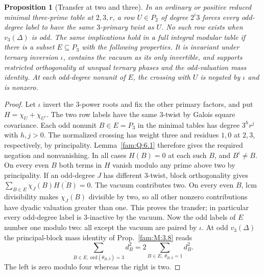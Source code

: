 \documentclass[11pt,a4paper]{article}
\numberwithin{equation}{section}
\newtheorem{proposition}[theorem]{Proposition}
\theoremstyle{remark}
\begin{document}
\begin{proposition}[Transfer at two and three]\label{fam:Q:6.2}
In an ordinary or positive reduced minimal three-prime table at $2,3,r$, a row
$U\in P_2$ of degree $2^i3$ forces every odd-degree label
to have the same $3$-primary twist as $U$. No such row exists
when $v_3(\Delta)$ is odd. The same implications hold in a full
integral modular table if there is a subset $E\subseteq P_3$
with the following properties. It is invariant under ternary
inversion $\iota$, contains the vacuum as its only invertible,
and supports restricted orthogonality at unequal ternary phases
and the odd-valuation mass identity. At each odd-degree nonunit
of $E$, the crossing with $U$ is negated by $\iota$ and is nonzero.
\end{proposition}
\begin{proof}
Let $\iota$ invert the $3$-power roots and fix the other primary
factors, and put $H=\chi_U+\chi_{U^\iota}$. The two row labels
have the same $3$-twist by Galois square covariance. Each odd
nonunit $B\in E=P_3$ in the minimal tables has degree $3^h r^j$
with $h,j>0$. The normalized crossing has weight three and residues
$1,0$ at $2,3$, respectively, by principality. Lemma~\ref{fam:Q:6.1}
therefore gives the required negation and nonvanishing. In all cases
$H(B)=0$ at each such $B$, and $B^\iota\ne B$. On every even $B$ both terms in $H$ vanish
modulo any prime above two by principality. If an odd-degree $J$
has different $3$-twist, block orthogonality gives
$\sum_{B\in E}\chi_J(B)\overline{H(B)}=0$. The vacuum
contributes two. On every even $B$, lcm divisibility makes
$\chi_J(B)$ divisible by two, so all other nonzero contributions
have dyadic valuation greater than one. This proves the transfer;
in particular every odd-degree label is $3$-inactive by the vacuum.
Now the odd labels of $E$ number one modulo two: all except
the vacuum are paired by $\iota$. At odd $v_3(\Delta)$ the
principal-block mass identity of Prop.~\ref{fam:M:3.8} reads
\[
 \sum_{B\in E,\ \mathrm{ord}(\theta_{B,3})=3} d_B^2
 =2\sum_{B\in E,\ \theta_{B,3}=1}d_B^2.
\]
The left is zero modulo four whereas the right is two.
\end{proof}
\end{document}
